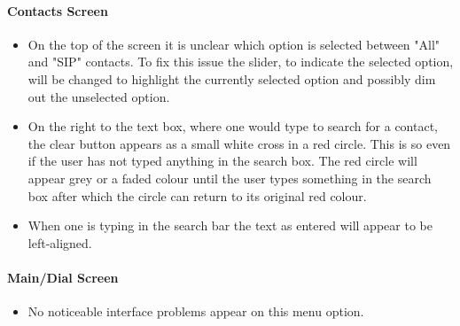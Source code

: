 \documentclass[11pt]{article}
\begin{document}
\paragraph{Contacts Screen}
\begin{itemize}
\item On the top of the screen it is unclear which option is selected between "All" and "SIP" contacts. To fix this issue the slider, to indicate the selected option, will be changed to highlight the currently selected option and possibly dim out the unselected option.

\item On the right to the text box, where one would type to search for a contact, the clear button appears as a small white cross in a red circle. This is so even if the user has not typed anything in the search box. The red circle will appear grey or a faded colour until the user types something in the search box after which the circle can return to its original red colour. 

\item When one is typing in the search bar the text as entered will appear to be left-aligned.
\end{itemize}

\paragraph{Main/Dial Screen}
\begin{itemize}
\item No noticeable interface problems appear on this menu option.
\end{itemize}
\end{document}
